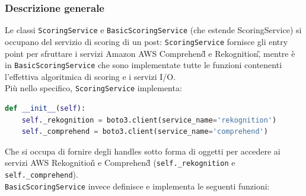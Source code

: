 \subsubsection{Descrizione generale}
Le classi \verb+ScoringService+ e \verb+BasicScoringService+ (che estende ScoringService\verb++) si occupano
del servizio di scoring di un post: \verb+ScoringService+ fornisce gli entry point per sfruttare 
i servizi Amazon AWS Comprehend\G{} e Rekognition\G, mentre è in \verb+BasicScoringService+ che sono 
implementate tutte le funzioni contenenti l'effettiva algoritmica di scoring e i servizi I/O.\\
Più nello specifico, \verb+ScoringService+ implementa:
\begin{lstlisting}[language=Python]
def __init__(self):
    self._rekognition = boto3.client(service_name='rekognition')
    self._comprehend = boto3.client(service_name='comprehend')
\end{lstlisting}
Che si occupa di fornire degli handles sotto forma di oggetti per accedere ai servizi AWS Rekognition\G{}
e Comprehend\G{} (\verb+self._rekognition+ e \verb+self._comprehend+).\\
\verb+BasicScoringService+ invece definisce e implementa le seguenti funzioni:

